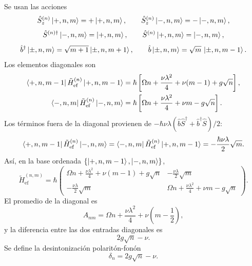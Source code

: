 \documentclass[11pt]{article}
\newcommand{\bdag}{\hat b^\dagger}
\begin{document}
Se usan las acciones
\begin{equation}
  \hat S_z^{(n)}\ket{+,n,m}=+\ket{+,n,m},
  \qquad
  \hat S_z^{(n)}\ket{-,n,m}=-\ket{-,n,m},
\end{equation}
\begin{equation}
  \hat S^{(n)\dagger}\ket{-,n,m}=\ket{+,n,m},
  \qquad
  \hat S^{(n)}\ket{+,n,m}=\ket{-,n,m},
\end{equation}
\begin{equation}
  \bdag\ket{\pm,n,m}=\sqrt{m+1}\ket{\pm,n,m+1},
  \qquad
  \hat b\ket{\pm,n,m}=\sqrt m\,\ket{\pm,n,m-1}.
\end{equation}
Los elementos diagonales son
\begin{align}
  \bra{+,n,m-1}\tilde H_{\mathrm{ef}}^{(n)}
  \ket{+,n,m-1}
  &=
  \hbar
  \left[
  \Omega n+\frac{\nu\lambda^2}{4}
  +
  \nu(m-1)
  +
  g\sqrt n
  \right],
  \\
  \bra{-,n,m}\tilde H_{\mathrm{ef}}^{(n)}
  \ket{-,n,m}
  &=
  \hbar
  \left[
  \Omega n+\frac{\nu\lambda^2}{4}
  +
  \nu m
  -
  g\sqrt n
  \right].
\end{align}
Los t\'erminos fuera de la diagonal provienen de
$-\hbar\nu\lambda(\hat b\hat S^\dagger+\bdag\hat S)/2$:
\begin{equation}
  \bra{+,n,m-1}\tilde H_{\mathrm{ef}}^{(n)}
  \ket{-,n,m}
  =
  \bra{-,n,m}\tilde H_{\mathrm{ef}}^{(n)}
  \ket{+,n,m-1}
  =
  -\frac{\hbar\nu\lambda}{2}\sqrt m.
\end{equation}
As\'i, en la base ordenada $\{\ket{+,n,m-1},\ket{-,n,m}\}$,
\begin{equation}
  \tilde H_{\mathrm{ef}}^{(n,m)}
  =
  \hbar
  \begin{pmatrix}
  \Omega n+\frac{\nu\lambda^2}{4}+\nu(m-1)+g\sqrt n
  &
  -\frac{\nu\lambda}{2}\sqrt m\\
  -\frac{\nu\lambda}{2}\sqrt m
  &
  \Omega n+\frac{\nu\lambda^2}{4}+\nu m-g\sqrt n
  \end{pmatrix}.
\end{equation}
El promedio de la diagonal es
\begin{equation}
  A_{nm}
  =
  \Omega n+\frac{\nu\lambda^2}{4}
  +
  \nu\left(m-\frac{1}{2}\right),
\end{equation}
y la diferencia entre las dos entradas diagonales es
\begin{equation}
  2g\sqrt n-\nu.
\end{equation}
Se define la desintonizaci\'on polarit\'on-fon\'on
\begin{equation}
  \delta_n=2g\sqrt n-\nu.
\end{equation}
\end{document}
